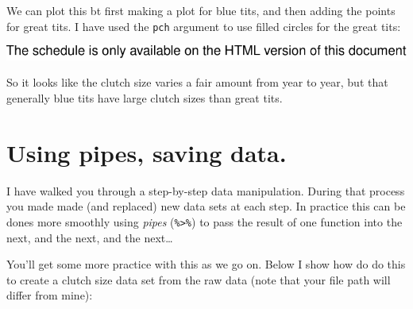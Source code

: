 \documentclass[
  a4paperpaper,
]{book}
\newenvironment{Shaded}{\begin{snugshade}}{\end{snugshade}}
\newcommand{\DataTypeTok}[1]{\textcolor[rgb]{0.13,0.29,0.53}{#1}}
\newcommand{\DecValTok}[1]{\textcolor[rgb]{0.00,0.00,0.81}{#1}}
\newcommand{\KeywordTok}[1]{\textcolor[rgb]{0.13,0.29,0.53}{\textbf{#1}}}
\newcommand{\NormalTok}[1]{#1}
\newcommand{\OperatorTok}[1]{\textcolor[rgb]{0.81,0.36,0.00}{\textbf{#1}}}
\newcommand{\StringTok}[1]{\textcolor[rgb]{0.31,0.60,0.02}{#1}}
\begin{document}
We can plot this bt first making a plot for blue tits, and then adding the points for great tits. I have used the \texttt{pch} argument to use filled circles for the great tits:

\begin{Shaded}
\end{Shaded}

\includegraphics{BB852_files/figure-latex/unnamed-chunk-53-1.pdf}

So it looks like the clutch size varies a fair amount from year to year, but that generally blue tits have large clutch sizes than great tits.

\hypertarget{using-pipes-saving-data.}{%
\section{Using pipes, saving data.}\label{using-pipes-saving-data.}}

I have walked you through a step-by-step data manipulation. During that process you made made (and replaced) new data sets at each step. In practice this can be dones more smoothly using \emph{pipes} (\texttt{\%\textgreater{}\%}) to pass the result of one function into the next, and the next, and the next\ldots{}

You'll get some more practice with this as we go on.
Below I show how do do this to create a clutch size data set from the raw data (note that your file path will differ from mine):
\end{document}
